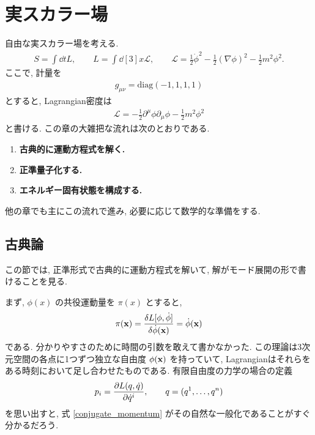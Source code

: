\documentclass[../note01.tex]{subfiles}
\begin{document}
\section{実スカラー場}
自由な実スカラー場を考える.
\begin{align}\label{Lagrangian}
    S=\int\dd{t}L, \qquad L = \int\dd[3]{x} \mathcal{L}, \qquad
    \mathcal{L} = \frac{1}{2}\dot{\phi}^2 -\frac{1}{2}(\nabla\phi)^2 -\frac{1}{2}m^2\phi^2.
\end{align}
ここで, 計量を
\begin{align}
    g_{\mu\nu} = \mathrm{diag} (-1,1,1,1)
\end{align}
とすると, Lagrangian密度は
\begin{align}
    \mathcal{L} = -\frac{1}{2}\partial^\mu\phi\partial_\mu\phi - \frac{1}{2}m^2\phi^2
\end{align}
と書ける. この章の大雑把な流れは次のとおりである.
\begin{enumerate}
    \item \textbf{古典的に運動方程式を解く.}
    \item \textbf{正準量子化する.}
    \item \textbf{エネルギー固有状態を構成する.}
\end{enumerate}
他の章でも主にこの流れで進み, 必要に応じて数学的な準備をする.
\subsection{古典論}
この節では, 正準形式で古典的に運動方程式を解いて, 解がモード展開の形で書けることを見る.

まず, $ \phi(x) $ の共役運動量を $ \pi(x) $ とすると,
\begin{align}\label{conjugate_momentum}
    \pi(\vb{x}) = \fdv{L[\phi,\dot{\phi}]}{\dot{\phi}(\vb{x})} = \dot{\phi}(\vb{x})
\end{align}
である. 分かりやすさのために時間の引数を敢えて書かなかった.
この理論は3次元空間の各点に1つずつ独立な自由度 $ \phi(\vb{x}) $ を持っていて, Lagrangianはそれらをある時刻において足し合わせたものである.
有限自由度の力学の場合の定義
\begin{align*}
    p_i = \pdv{L(q,\dot{q})}{\dot{q}^i}, \qquad q=(q^1,\dots,q^n)
\end{align*}
を思い出すと, 式 \eqref{conjugate_momentum} がその自然な一般化であることがすぐ分かるだろう.
\end{document}

